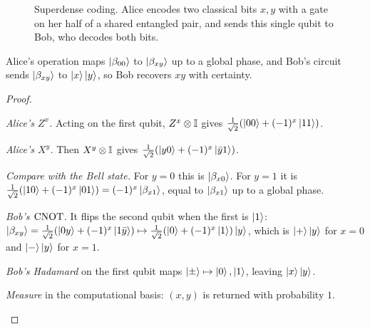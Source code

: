 \begin{figure}[htb]
  \centering
  \caption{Superdense coding. Alice encodes two classical bits $x,y$ with a gate on her half of a shared entangled pair, and sends this single qubit to Bob, who decodes both bits.}
  \label{fig:superdense}
\end{figure}

\begin{proposition}\label{prop:superdense}
  Alice's operation maps $\left|\beta_{00}\right\rangle$ to $\left|\beta_{xy}\right\rangle$ up to a global phase, and Bob's circuit sends $\left|\beta_{xy}\right\rangle$ to $\left|x\right\rangle\left|y\right\rangle$, so Bob recovers $xy$ with certainty.
\end{proposition}
\begin{proof}
  \begin{steps}
    \item \emph{Alice's $Z^x$.} Acting on the first qubit, $Z^x\otimes\mathbb{I}$ gives $\frac1{\sqrt2}(\left|00\right\rangle+(-1)^x\left|11\right\rangle)$.
    \item \emph{Alice's $X^y$.} Then $X^y\otimes\mathbb{I}$ gives $\frac1{\sqrt2}(\left|y0\right\rangle+(-1)^x\left|\bar y1\right\rangle)$.
    \item \emph{Compare with the Bell state.} For $y=0$ this is $\left|\beta_{x0}\right\rangle$. For $y=1$ it is $\frac1{\sqrt2}(\left|10\right\rangle+(-1)^x\left|01\right\rangle)=(-1)^x\left|\beta_{x1}\right\rangle$, equal to $\left|\beta_{x1}\right\rangle$ up to a global phase.
    \item \emph{Bob's $\mathrm{CNOT}$.} It flips the second qubit when the first is $\left|1\right\rangle$: $\left|\beta_{xy}\right\rangle=\frac{1}{\sqrt2}(\left|0y\right\rangle+(-1)^x\left|1\bar y\right\rangle)\mapsto\frac1{\sqrt2}(\left|0\right\rangle+(-1)^x\left|1\right\rangle)\left|y\right\rangle$, which is $\left|+\right\rangle\left|y\right\rangle$ for $x=0$ and $\left|-\right\rangle\left|y\right\rangle$ for $x=1$.
    \item \emph{Bob's Hadamard} on the first qubit maps $\left|\pm\right\rangle\mapsto\left|0\right\rangle,\left|1\right\rangle$, leaving $\left|x\right\rangle\left|y\right\rangle$.
    \item \emph{Measure} in the computational basis: $(x,y)$ is returned with probability $1$. \qedhere
  \end{steps}
\end{proof}

